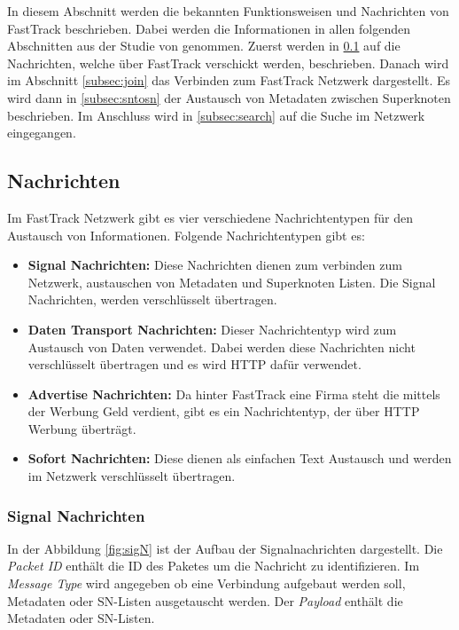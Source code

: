 In diesem Abschnitt werden die bekannten Funktionsweisen und Nachrichten von FastTrack beschrieben.
Dabei werden die Informationen in allen folgenden Abschnitten aus der Studie \cite{liang2006fasttrack} von genommen.
Zuerst werden in \ref{subsec:nachricht} auf die Nachrichten, welche über FastTrack verschickt werden, beschrieben.
Danach wird im Abschnitt \ref{subsec:join} das Verbinden zum FastTrack Netzwerk dargestellt.
Es wird dann in \ref{subsec:sntosn} der Austausch von Metadaten zwischen Superknoten beschrieben.
Im Anschluss wird in \ref{subsec:search} auf die Suche im Netzwerk eingegangen.

\subsection{Nachrichten}
\label{subsec:nachricht}

Im FastTrack Netzwerk gibt es vier verschiedene Nachrichtentypen für den Austausch von Informationen. Folgende Nachrichtentypen gibt es:

\begin{itemize}
\item[1.] \textbf{Signal Nachrichten:} Diese Nachrichten dienen zum verbinden zum Netzwerk, austauschen von Metadaten und Superknoten Listen.
Die Signal Nachrichten, werden verschlüsselt übertragen.
\item[2.] \textbf{Daten Transport Nachrichten:} Dieser Nachrichtentyp wird zum Austausch von Daten verwendet. Dabei werden diese Nachrichten nicht verschlüsselt übertragen und es wird HTTP dafür verwendet.
\item[3.] \textbf{Advertise Nachrichten:} Da hinter FastTrack eine Firma steht die mittels der Werbung Geld verdient, gibt es ein Nachrichtentyp, der über HTTP Werbung überträgt.
\item[4.] \textbf{Sofort Nachrichten:} Diese dienen als einfachen Text Austausch und werden im Netzwerk verschlüsselt übertragen.
\end{itemize} 

\subsubsection{Signal Nachrichten}
\label{subsubsec:sigN}

In der Abbildung \ref{fig:sigN} ist der Aufbau der Signalnachrichten dargestellt.
Die \textit{Packet ID} enthält die ID des Paketes um die Nachricht zu identifizieren. 
Im \textit{Message Type} wird angegeben ob eine Verbindung aufgebaut werden soll, Metadaten oder SN-Listen ausgetauscht werden.
Der \textit{Payload} enthält die Metadaten oder SN-Listen.


